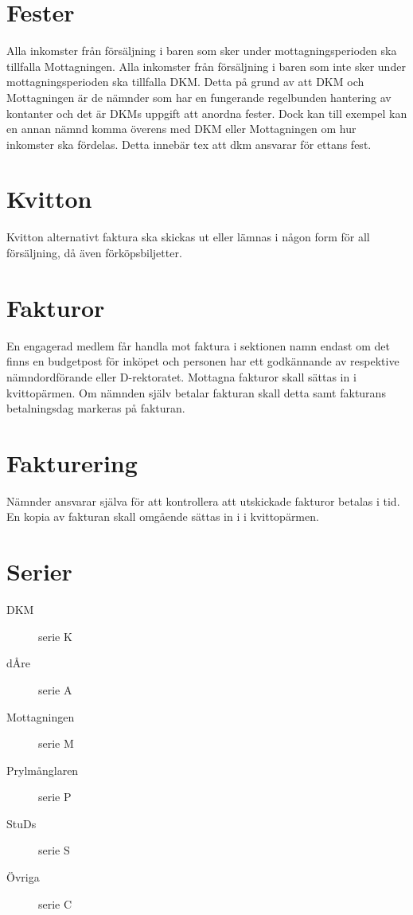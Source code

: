 \documentclass{dgovdoc}
\begin{document}
\section{Fester}

Alla inkomster från försäljning i baren som sker under mottagningsperioden ska
tillfalla Mottagningen. Alla inkomster från försäljning i baren som inte sker
under mottagningsperioden ska tillfalla DKM. Detta på grund av att DKM och
Mottagningen är de nämnder som har en fungerande regelbunden hantering av
kontanter och det är DKMs uppgift att anordna fester. Dock kan till exempel kan
en annan nämnd komma överens med DKM eller Mottagningen om hur inkomster ska
fördelas. Detta innebär tex att dkm ansvarar för ettans fest.

\section{Kvitton}

Kvitton alternativt faktura ska skickas ut eller lämnas i någon form för all
försäljning, då även förköpsbiljetter.

\section{Fakturor}

En engagerad medlem får handla mot faktura i sektionen namn endast om det finns
en budgetpost för inköpet och personen har ett godkännande av respektive
nämndordförande eller D-rektoratet. Mottagna fakturor skall sättas in i
kvittopärmen. Om nämnden själv betalar fakturan skall detta samt fakturans
betalningsdag markeras på fakturan.

\section{Fakturering}

Nämnder ansvarar själva för att kontrollera att utskickade fakturor betalas i
tid. En kopia av fakturan skall omgående sättas in i i kvittopärmen.

\appendix

\section{Serier}
\label{sec:serier}

\begin{description}
\item[DKM] serie K
\item[dÅre] serie A
\item[Mottagningen] serie M
\item[Prylmånglaren] serie P
\item[StuDs] serie S
\item[Övriga] serie C
\end{description}
\end{document}
